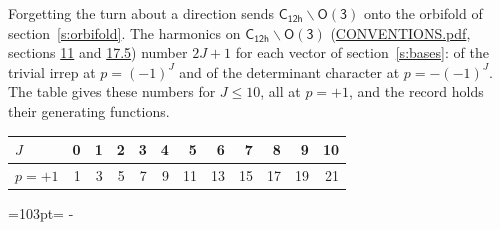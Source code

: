 \documentclass[10pt,a4paper]{article}
\newcommand{\needspace}[1]{\par\penalty-100\begingroup\dimen0=#1\relax\dimen2=\pagegoal
  \advance\dimen2-\pagetotal\ifdim\dimen0>\dimen2\relax\ifdim\dimen2>0pt\vfil\break\fi\fi
  \endgroup}
\numberwithin{equation}{section}
\newcommand{\grp}[1]{\mathsf{#1}}
\begin{document}
Forgetting the turn about a direction sends $\grp{C_{12h}}\backslash\grp{O(3)}$ onto the orbifold of section~\ref{s:orbifold}.
The harmonics on $\grp{C_{12h}}\backslash\grp{O(3)}$ (\href{../../CONVENTIONS.pdf}{CONVENTIONS.pdf}, sections \href{../../CONVENTIONS.pdf\#conv.11}{11} and \href{../../CONVENTIONS.pdf\#conv.17.5}{17.5}) number $2J + 1$ for each vector of section~\ref{s:bases}: of the trivial irrep at $p = (-1)^J$ and of the determinant character at $p = -(-1)^J$. The table gives these numbers for $J \le 10$, all at $p = +1$, and the record holds their generating functions.
{\small\setlength{\tabcolsep}{4pt}\begin{longtable}{@{}lrrrrrrrrrrr@{}}\toprule
$J$ & 0 & 1 & 2 & 3 & 4 & 5 & 6 & 7 & 8 & 9 & 10\\\midrule\endhead
\bottomrule\endfoot\endlastfoot
$p = +1$ & 1 & 3 & 5 & 7 & 9 & 11 & 13 & 15 & 17 & 19 & 21\\
\bottomrule\end{longtable}}
\needspace{103pt}
\end{document}
